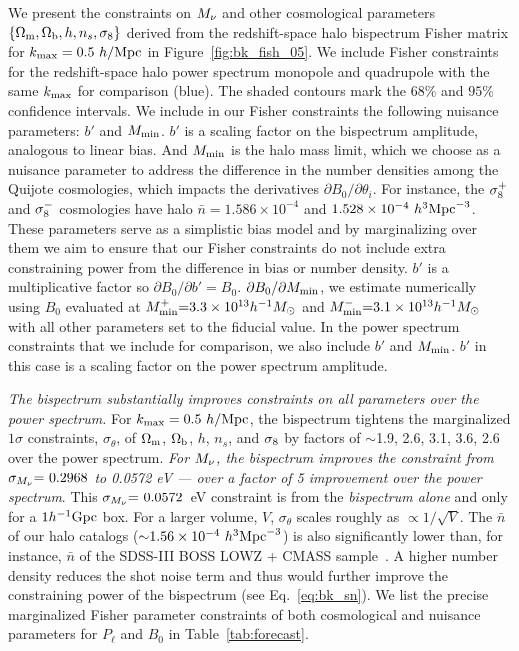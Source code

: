We present the constraints on $M_\nu$ and other cosmological parameters 
$\{\Omega_{\rm m}, \Omega_{\rm b}, h, n_s, \sigma_8\}$ derived from the redshift-space halo bispectrum 
Fisher matrix for $k_{\rm max} = 0.5~h/{\rm Mpc}$ in Figure~\ref{fig:bk_fish_05}. 
We include Fisher constraints for the redshift-space halo power spectrum 
monopole and quadrupole with the same $k_{\rm max}$ for comparison (blue). 
The shaded contours mark the $68\%$ and $95\%$ confidence intervals. We include 
in our Fisher constraints the following nuisance parameters: $b'$ and $M_{\rm min}$. 
$b'$ is a scaling factor on the bispectrum amplitude, analogous to linear bias. 
And $M_{\rm min}$ is the halo mass limit, which we choose as a nuisance
parameter to address the difference in the number densities among the Quijote
cosmologies, which impacts the derivatives $\partial B_0/\partial \theta_i$. 
For instance, the $\sigma_8^{+}$ and $\sigma_8^{-}$ cosmologies have halo 
$\bar{n} = 1.586\times10^{-4}$ and $1.528 \times 10^{-4}~h^{3}{\rm Mpc}^{-3}$. 
These parameters serve as a simplistic bias model and by marginalizing 
over them we aim to ensure that our Fisher constraints do not include extra 
constraining power from the difference in bias or number density. $b'$ is a 
multiplicative factor so $\partial B_0/\partial b' = B_0$. 
$\partial B_0/\partial M_{\rm min}$, we estimate numerically using 
$B_0$ evaluated at $M^{+}_{\rm min}{=}3.3\times10^{13}h^{-1}M_\odot$ 
and $M^{-}_{\rm min}{=}3.1\times10^{13}h^{-1}M_\odot$ with all other parameters 
set to the fiducial value. 
In the power spectrum constraints that we include for comparison, we also 
include $b'$ and $M_{\rm min}$. $b'$ in this case is a scaling factor on 
the power spectrum amplitude. 

{\em The bispectrum substantially improves constraints on all parameters 
over the power spectrum.} For $k_{\rm max} = 0.5~h/{\rm Mpc}$, the 
bispectrum tightens the marginalized $1\sigma$ constraints, $\sigma_\theta$, of $\Omega_{\rm m}$, 
$\Omega_{\rm b}$, $h$, $n_s$, and $\sigma_8$ by factors of $\sim$1.9, 2.6, 3.1, 3.6, 2.6 over 
the power spectrum. {\em For $M_\nu$, the bispectrum improves the constraint 
from $\sigma_{M_\nu}{=}~0.2968$ to 0.0572 eV --- over a factor of 5 improvement 
over the power spectrum}. This $\sigma_{M_\nu}{=}~0.0572$~eV constraint is from 
the {\em bispectrum alone} and only for a $1h^{-1}{\rm Gpc}$ box. For a larger 
volume, $V$, $\sigma_\theta$ scales roughly as $\propto1/\sqrt{V}$. 
The $\bar{n}$ of our halo catalogs (${\sim}1.56 \times 10^{-4}~h^3{\rm Mpc}^{-3}$) 
is also significantly lower than, for instance, $\bar{n}$ of the SDSS-III BOSS 
LOWZ + CMASS sample~\citep[${\sim}3 \times 10^{-4}~h^3{\rm Mpc}^{-3}$;][]{alam2015}. 
A higher number density reduces the shot noise term and thus would
further improve the constraining power of the bispectrum (see Eq.~\ref{eq:bk_sn}). 
We list the precise marginalized Fisher parameter constraints of both cosmological 
and nuisance parameters for $P_\ell$ and $B_0$ in Table~\ref{tab:forecast}. 

